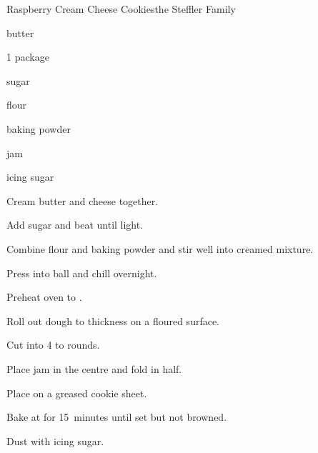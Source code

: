 \begin{recipe}{Raspberry Cream Cheese Cookies}{the Steffler Family}{}

\begin{ingredients}
\item {} butter
\item 1 package 
\item \C{\quarter} sugar
\item {} flour
\item \tp{\half} baking powder
\item \C{\half}  jam
\item icing sugar
\end{ingredients}

\begin{directions}
\item Cream butter and cheese together.
\item Add sugar and beat until light.
\item Combine flour and baking powder and stir well into creamed mixture.
\item Press into ball and chill overnight.
\item Preheat oven to .
\item Roll out dough to \cm{\half} thickness on a floured surface.
\item Cut into 4 to  rounds.
\item Place \tp{\half} jam in the centre and fold in half.
\item Place on a greased cookie sheet.
\item Bake at  for 15~minutes until set but not browned.
\item Dust with icing sugar.
\end{directions}
\end{recipe}
